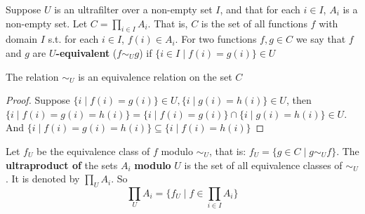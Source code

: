 \documentclass[11pt]{article}
\begin{document}
Suppose \(U\) is an ultrafilter over a non-empty set \(I\), and that for
each \(i\in I\), \(A_i\) is a non-empty set. Let \(C=\prod_{i\in I}A_i\).
That is, \(C\) is the set of all functions \(f\) with domain \(I\) s.t. for
each \(i\in I\), \(f(i)\in A_i\). For two functions \(f,g\in C\) we say that
\(f\) and \(g\) are \textbf{\(U\)-equivalent} (\(f\sim_U g\)) if \(\{i\in I\mid
    f(i)=g(i)\}\in U\)

\begin{proposition}[]
The relation \(\sim_U\) is an equivalence relation on the set \(C\)
\end{proposition}

\begin{proof}
Suppose \(\{i\mid f(i)=g(i)\}\in U,\{i\mid g(i)=h(i)\}\in U\), then
\(\{i\mid f(i)=g(i)=h(i)\}=\{i\mid f(i)=g(i)\}\cap\{i\mid g(i)=h(i)\}\in
    U\). And
\(\{i\mid f(i)=g(i)=h(i)\}\subseteq\{i\mid f(i)=h(i)\}\)
\end{proof}

\begin{definition}[]
Let \(f_U\) be the equivalence class of \(f\) modulo \(\sim_U\), that is:
\(f_U=\{g\in C\mid g\sim_U f\}\). The \textbf{ultraproduct of} the sets \(A_i\)
\textbf{modulo} \(U\) is the set of all equivalence classes of \(\sim_U\). It is
denoted by \(\prod_UA_i\). So
\begin{equation*}
\prod_UA_i=\{f_U\mid f\in\prod_{i\in I}A_i\}
\end{equation*}
\end{definition}
\end{document}
